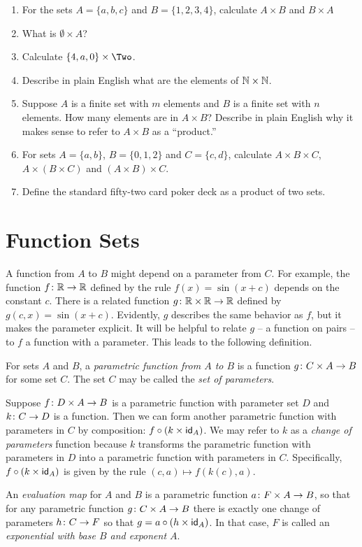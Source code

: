 \begin{exercises}
	\begin{enumerate}
		\item For the sets $A = \{a,b,c\}$ and $B = \{1,2,3,4\}$, calculate $A\times B$ and $B\times A$
		\item What is $\emptyset \times A$? 
		\item Calculate $\{4,a,0\}\times \Two$.
		\item Describe in plain English what are the elements of $\mathbb N\times \mathbb N$.
		\item Suppose $A$ is a finite set with $m$ elements and $B$ is a finite set with $n$ elements.
		How many elements are in $A\times B$?
		Describe in plain English why it makes sense to refer to $A\times B$ as a ``product.''
		\item For sets $A=\{a,b\}$, $B=\{0,1,2\}$ and $C=\{c,d\}$, calculate $A\times B\times C$, $A\times (B\times C)$ and $(A\times B)\times C$.
		\item Define the standard fifty-two card poker deck as a product of two sets.
	\end{enumerate}
\end{exercises}

\section{Function Sets}

A function from $A$ to $B$ might depend on a parameter from $C$. 
For example, the function ${f}\colon{\mathbb R}\to{\mathbb R}$ defined by the rule $f(x) = \sin(x + c)$ depends on the constant $c$.
There is a related function ${g}\colon{\mathbb R\times \mathbb R}\to{\mathbb R}$ defined by $g(c,x) = \sin(x+c)$.
Evidently, $g$ describes the same behavior as $f$, but it makes the parameter explicit. It will be helpful to relate $g$ -- a function on pairs -- to $f$ a function with a parameter.
This leads to the following definition.

\begin{defn}
	For sets $A$ and $B$, a \emph{parametric function from $A$ to $B$} is a function ${g}\colon{C\times A}\to{B}$ for some set $C$.
	The set $C$ may be called the \emph{set of parameters}.
	
	Suppose ${f}\colon{D\times A}\to{B}$ is a parametric function with parameter set $D$ and ${k}\colon{C}\to{D}$ is a function.
	Then we can form another parametric function with parameters in $C$ by composition: $f\circ (k\times \textsf{id}_A)$.
	We may refer to $k$ as a \emph{change of parameters} function because $k$ transforms the parametric function with parameters in $D$ into a parametric function with parameters in $C$. 
	Specifically, $f\circ(k\times \textsf{id}_A)$ is given by the rule $(c,a)\mapsto f(k(c),a)$. 
	
	An \emph{evaluation map} for $A$ and $B$ is a parametric function ${a}\colon{F\times A}\to{B}$, so that for any 
	parametric function ${g}\colon{C\times A}\to{B}$ there is exactly one change of parameters ${h}\colon{C}\to{F}$ so that
	$g = a\circ (h\times \textsf{id}_A)$. In that case, $F$ is called an \emph{exponential with base $B$ and exponent $A$}.
\end{defn}

